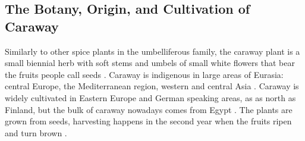 

\subsection{The Botany, Origin, and  Cultivation of Caraway}

Similarly to other spice plants in the umbelliferous family, the caraway plant is a small biennial herb with soft stems and umbels of small white flowers that bear the fruits people call seeds \autocite[100]{van_wyk_culinary_2014}. Caraway is indigenous in large areas of Eurasia: central Europe, the Mediterranean region, western and central Asia \autocite{mabberley_mabberleys_2017}. 
Caraway is widely cultivated in Eastern Europe and German speaking areas, as as north as Finland, but the bulk of caraway nowadays comes from Egypt \autocite{farrell_spices_1985}. The plants are grown from seeds, harvesting happens in the second year when the fruits ripen and turn brown \autocite{van_wyk_culinary_2014}.

